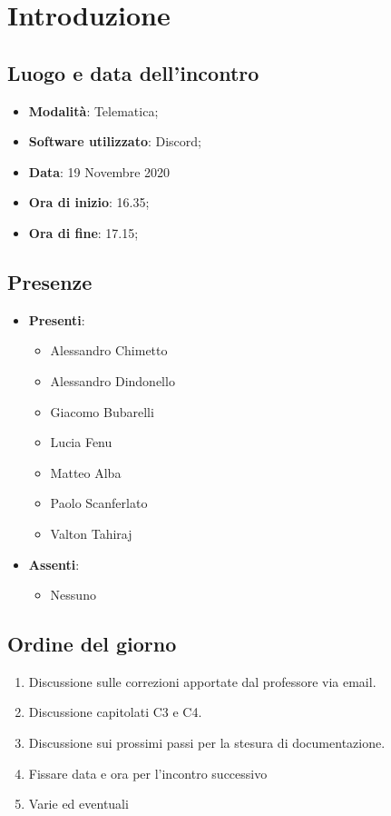 \documentclass[]{article}
\begin{document}
	
	
	
	\newpage
	
	\section{Introduzione}
\subsection{Luogo e data dell'incontro}
\begin{itemize}
	\item \textbf{Modalità}: Telematica;
	\item \textbf{Software utilizzato}: Discord;
	\item \textbf{Data}: 19 Novembre 2020
	\item \textbf{Ora di inizio}: 16.35;
	\item \textbf{Ora di fine}: 17.15;
\end{itemize}

\subsection{Presenze}
\begin{itemize}
	\item \textbf{Presenti}: 
	\begin{itemize}
		\item Alessandro Chimetto
		\item Alessandro Dindonello
		\item Giacomo Bubarelli
		\item Lucia Fenu
		\item Matteo Alba
		\item Paolo Scanferlato
		\item Valton Tahiraj
	\end{itemize}
	\item \textbf{Assenti}:
	\begin{itemize}
		\item Nessuno
	\end{itemize}
\end{itemize}


\subsection{Ordine del giorno}
\begin{enumerate}
	\item Discussione sulle correzioni apportate dal professore via email.
	\item Discussione capitolati C3 e C4.
	\item Discussione sui prossimi passi per la stesura di documentazione.
	\item Fissare data e ora per l'incontro successivo
	\item Varie ed eventuali
\end{enumerate}
\end{document}
